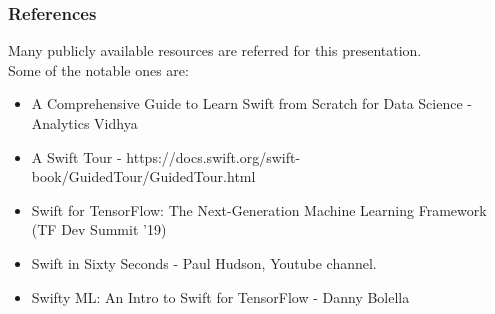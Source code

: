 \begin{frame}\frametitle{References}
Many publicly available resources are referred for this presentation. \\

\scriptsize
Some of the notable ones are:
\begin{itemize}
\item A Comprehensive Guide to Learn Swift from Scratch for Data Science - Analytics Vidhya
\item A Swift Tour - https://docs.swift.org/swift-book/GuidedTour/GuidedTour.html
\item Swift for TensorFlow: The Next-Generation Machine Learning Framework (TF Dev Summit '19)
\item Swift in Sixty Seconds - Paul Hudson, Youtube channel.
\item Swifty ML: An Intro to Swift for TensorFlow - Danny Bolella
\end{itemize}
\end{frame}
